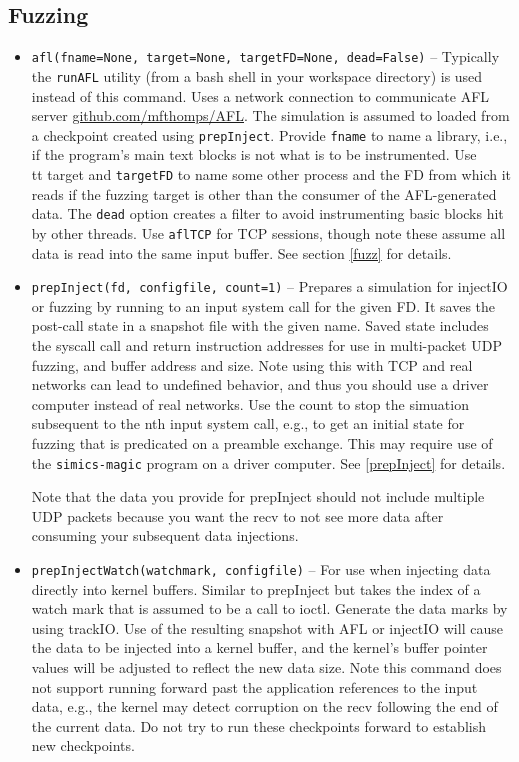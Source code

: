 \documentclass[titlepage]{article}
\begin{document}
\subsection{Fuzzing}
\begin{itemize}

\item{\tt afl(fname=None, target=None, targetFD=None, dead=False)} -- Typically the {\tt runAFL} utility (from a bash shell in your workspace directory) is used instead of this command.  Uses a network connection to communicate AFL server \url{github.com/mfthomps/AFL}.  
The simulation is assumed to loaded from a checkpoint created using {\tt prepInject}.  Provide {\tt fname} to name a library, i.e., if the program's main
text blocks is not what is to be instrumented.
Use {\\tt target} and {\tt targetFD} to name some other process 
and the FD from which it reads if the fuzzing target is other
than the consumer of the AFL-generated data.  The {\tt dead} option creates a filter to avoid instrumenting basic blocks hit by other threads.
Use {\tt aflTCP} for TCP sessions, though note these assume all data is read into
the same input buffer.  
See section \ref{fuzz} for details.

\item{\tt prepInject(fd, configfile, count=1)} -- Prepares a simulation for injectIO or fuzzing by running to an input system call for the given FD.  It saves the post-call state in a snapshot
file with the given name.  Saved state includes the syscall call and return instruction addresses for use in multi-packet UDP fuzzing, and buffer address and size.
Note using this with TCP and real networks can lead to undefined behavior, and thus you should use a driver computer instead of real networks.  
Use the count to stop the simuation subsequent to the nth input system call, e.g., to get an initial state for fuzzing that is predicated on a preamble exchange.
This may require use of the {\tt simics-magic} program on a driver computer.  See \ref{prepInject} for details.

Note that the data you provide for prepInject should not include multiple UDP packets because you want the recv to not see more data after consuming your
subsequent data injections.

\item{\tt prepInjectWatch(watchmark, configfile)} -- For use when injecting data directly into kernel buffers.  Similar to prepInject but takes the index of a watch 
mark that is assumed to be a call to ioctl. Generate the data marks by using trackIO.   Use of the resulting snapshot with AFL or injectIO will cause the data to be injected
into a kernel buffer, and the kernel's buffer pointer values will be adjusted to reflect the new data size.  Note this command does not support running forward past the application
references to the input data, e.g., the kernel may detect corruption on the recv following the end of the current data.
Do not try to run these checkpoints forward to establish new checkpoints.


\end{itemize}
\end{document}

